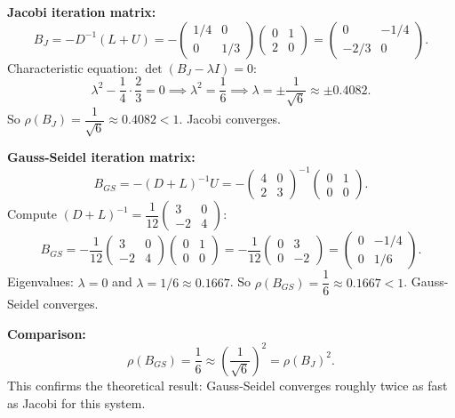 \documentclass[12pt,a4paper]{article}
\begin{document}
\textbf{Jacobi iteration matrix:}
\[
B_J = -D^{-1}(L+U)
= -\begin{pmatrix}1/4 & 0 \\ 0 & 1/3\end{pmatrix}
  \begin{pmatrix}0 & 1 \\ 2 & 0\end{pmatrix}
= \begin{pmatrix}0 & -1/4 \\ -2/3 & 0\end{pmatrix}.
\]
Characteristic equation: \(\det(B_J - \lambda I)=0\):
\[
  \lambda^2 - \frac{1}{4}\cdot\frac{2}{3} = 0 \implies \lambda^2 = \frac{1}{6}
  \implies \lambda = \pm\frac{1}{\sqrt{6}} \approx \pm 0.4082.
\]
So \(\rho(B_J) = \dfrac{1}{\sqrt{6}} \approx 0.4082 < 1\). Jacobi converges.

\textbf{Gauss-Seidel iteration matrix:}
\[
B_{GS} = -(D+L)^{-1}U
= -\begin{pmatrix}4 & 0 \\ 2 & 3\end{pmatrix}^{-1}\begin{pmatrix}0 & 1 \\ 0 & 0\end{pmatrix}.
\]
Compute \((D+L)^{-1} = \dfrac{1}{12}\begin{pmatrix}3 & 0 \\ -2 & 4\end{pmatrix}\):
\[
B_{GS} = -\frac{1}{12}\begin{pmatrix}3 & 0 \\ -2 & 4\end{pmatrix}
\begin{pmatrix}0 & 1 \\ 0 & 0\end{pmatrix}
= -\frac{1}{12}\begin{pmatrix}0 & 3 \\ 0 & -2\end{pmatrix}
= \begin{pmatrix}0 & -1/4 \\ 0 & 1/6\end{pmatrix}.
\]
Eigenvalues: \(\lambda = 0\) and \(\lambda = 1/6 \approx 0.1667\).
So \(\rho(B_{GS}) = \dfrac{1}{6} \approx 0.1667 < 1\). Gauss-Seidel converges.

\textbf{Comparison:}
\[
\rho(B_{GS}) = \frac{1}{6} \approx \left(\frac{1}{\sqrt{6}}\right)^2 = \rho(B_J)^2.
\]
This confirms the theoretical result: Gauss-Seidel converges roughly twice as fast as Jacobi
for this system.
\end{document}
